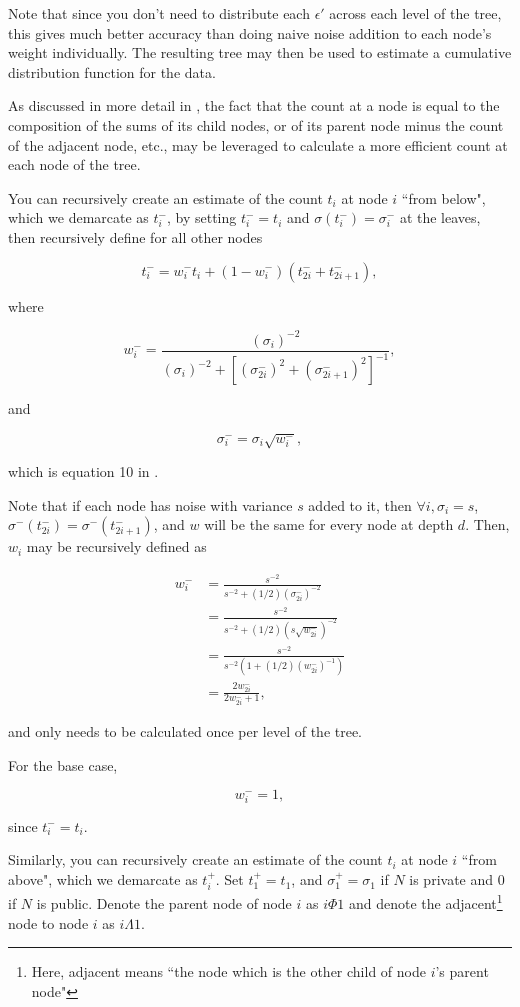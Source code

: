 \documentclass[11pt, oneside]{article}
\newcommand{\eps}{\epsilon}
\begin{document}
Note that since you don't need to distribute each $\eps'$ across each level of the tree, this gives much better accuracy than doing naive noise addition to each node's weight individually. The resulting tree may then be used to estimate a cumulative distribution function for the data. 

As discussed in more detail in \cite{honaker}, the fact that the count at a node is equal to the composition of the sums of its child nodes, or of its parent node minus the count of the adjacent node, etc., may be leveraged to calculate a more efficient count at each node of the tree.

You can recursively create an estimate of the count $t_i$ at node $i$ ``from below", which we demarcate as $t_i^-$, by setting $t_i^- = t_i$ and $\sigma(t_i^-)=\sigma^-_i$ at the leaves, then recursively define for all other nodes 

$$ t_i^- = w_i^- t_i + (1-w_i^-)(t_{2i}^- + t_{2i+1}^-), $$

where

$$ w_i^- = \frac{(\sigma_i)^{-2}}{(\sigma_i)^{-2} + \left[ (\sigma_{2i}^-)^2 + (\sigma_{2i+1}^-)^2\right]^{-1}},$$

and 

$$ \sigma_i^- = \sigma_i \sqrt{w_i^-},$$

which is equation 10 in \cite{honaker}.

Note that if each node has noise with variance $s$ added to it, then $\forall i, \sigma_i=s$, $\sigma^-(t_{2i}^-) = \sigma^-(t_{2i+1}^-)$, and $w$ will be the same for every node at depth $d$. Then, $w_i$ may be recursively defined as 

\begin{align*}
w_i^- &= \frac{s^{-2}}{s^{-2} + (1/2)(\sigma_{2i}^-)^{-2}}\\
	&= \frac{s^{-2}}{s^{-2} + (1/2)\left(s\sqrt{w_{2i}^-}\right)^{-2}}\\
	&= \frac{s^{-2}}{s^{-2}(1+(1/2)(w_{2i}^-)^{-1})}\\
	&= \frac{2w_{2i}^-}{2w_{2i}^- + 1},
\end{align*}

and only needs to be calculated once per level of the tree.

For the base case, 

$$ w_i^- = 1,$$

since $t_i^- = t_i.$

Similarly, you can recursively create an estimate of the count $t_i$ at node $i$ ``from above", which we demarcate as $t_i^+$. Set $t_1^+ = t_1$, and $\sigma_1^+ = \sigma_1$ if $N$ is private and 0 if $N$ is public. Denote the parent node of node $i$ as $i \Phi 1$ and denote the adjacent\footnote{Here, adjacent means ``the node which is the other child of node $i$'s parent node"} node to node $i$ as $i\Lambda1$. 
\end{document}
